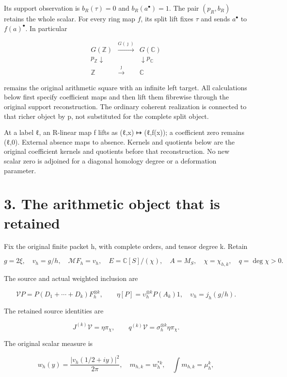 \documentclass[
  11pt,
]{article}
\begin{document}
Its support observation is \(b_R(\tau)=0\) and \(b_R(a^\bullet)=1\). The
pair \((p_R,b_R)\) retains the whole scalar. For every ring map \(f\),
its split lift fixes \(\tau\) and sends \(a^\bullet\) to
\(f(a)^\bullet\). In particular

\[
\begin{array}{ccc}
G(\mathbb Z)&\xrightarrow{G(\jmath)}&G(\mathbb C)\\
p_{\mathbb Z}\downarrow&&\downarrow p_{\mathbb C}\\
\mathbb Z&\xrightarrow{\jmath}&\mathbb C
\end{array}
\tag{4}
\]

remains the original arithmetic square with an infinite left target. All
calculations below first specify coefficient maps and then lift them
fibrewise through the original support reconstruction. The ordinary
coherent realization is connected to that richer object by p, not
substituted for the complete split object.

At a label ℓ, an R-linear map f lifts as (ℓ,x) ↦ (ℓ,f(x)); a coefficient
zero remains (ℓ,0). External absence maps to absence. Kernels and
quotients below are the original coefficient kernels and quotients
before that reconstruction. No new scalar zero is adjoined for a
diagonal homology degree or a deformation parameter.

\section{3. The arithmetic object that is
retained}\label{the-arithmetic-object-that-is-retained}

Fix the original finite packet h, with complete orders, and tensor
degree k. Retain

\[
g=2\xi,\quad v_h=g/h,\quad \mathcal MF_h=v_h,
\quad E=\mathbb C[S]/(\chi),\quad A=M_S,
\quad\chi=\chi_{h,k},\quad q=\deg\chi>0.
\tag{5}
\]

The source and actual weighted inclusion are

\[
\mathcal V P=P(D_1+\cdots+D_k)F_h^{\otimes k},
\qquad
\eta[P]=\upsilon_h^{\otimes k}P(A_k)1,
\quad \upsilon_h=j_h(g/h).
\tag{6}
\]

The retained source identities are

\[
J^{(k)}\mathcal V=\eta\pi_\chi,
\qquad q^{(k)}\mathcal V
 =\sigma_h^{\otimes k}\eta\pi_\chi.
\tag{7}
\]

The original scalar measure is

\[
w_h(y)=\frac{|v_h(1/2+iy)|^2}{2\pi},\quad
m_{h,k}=w_h^{*k},\quad\int m_{h,k}=\mu_h^k,
\tag{8}
\]
\end{document}
